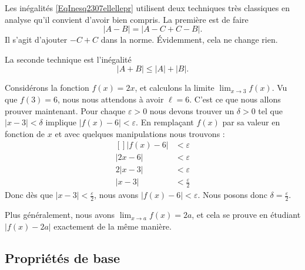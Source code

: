 \begin{remark}		\label{RemTechniqueIneqs}
	Les inégalités \eqref{EqInesq2307ellellepr} utilisent deux techniques très classiques en analyse qu'il convient d'avoir bien compris. La première est de faire
	\begin{equation}
		| A-B |=| A-C+C-B |.
	\end{equation}
	Il s'agit d'ajouter $-C+C$ dans la norme. Évidemment, cela ne change rien.

	La seconde technique est l'inégalité
	\begin{equation}
		| A+B |\leq| A |+| B |.
	\end{equation}
\end{remark}

\begin{example}
	Considérons la fonction $f(x)=2x$, et calculons la limite $\lim_{x\to 3} f(x)$. Vu que $f(3)=6$, nous nous attendons à avoir $\ell=6$. C'est ce que nous allons prouver maintenant. Pour chaque $\varepsilon>0$ nous devons trouver un $\delta>0$ tel que $| x-3 |<\delta$ implique $| f(x)-6 |<\varepsilon$. En remplaçant $f(x)$ par sa valeur en fonction de $x$ et avec quelques manipulations nous trouvons :
	\begin{equation}
		\begin{aligned}[]
			| f(x)-6 |&<\varepsilon\\
			| 2x-6 |&<\varepsilon\\
			2| x-3 |&<\varepsilon\\
			| x-3 |&<\frac{ \varepsilon }{2}
		\end{aligned}
	\end{equation}
	Donc dès que $| x-3 |<\frac{ \varepsilon }{2}$, nous avons $| f(x)-6 |<\varepsilon$. Nous posons donc $\delta=\frac{ \varepsilon }{2}$.

	Plus généralement, nous avons $\lim_{x\to a} f(x)=2a$, et cela se prouve en étudiant $| f(x)-2a |$ exactement de la même manière.
\end{example}

\subsection{Propriétés de base}

